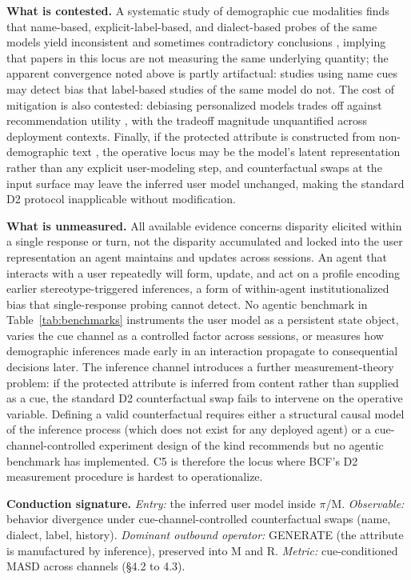 \documentclass[acmsmall,nonacm]{acmart}
\begin{document}
\textbf{What is contested.} A systematic study of demographic cue modalities finds that name-based, explicit-label-based, and dialect-based probes of the same models yield inconsistent and sometimes contradictory conclusions \cite{tonneau2026different}, implying that papers in this locus are not measuring the same underlying quantity; the apparent convergence noted above is partly artifactual: studies using name cues may detect bias that label-based studies of the same model do not. The cost of mitigation is also contested: debiasing personalized models trades off against recommendation utility \cite{vijjini2024exploring}, with the tradeoff magnitude unquantified across deployment contexts. Finally, if the protected attribute is constructed from non-demographic text \cite{staab2023memorization}, the operative locus may be the model's latent representation rather than any explicit user-modeling step, and counterfactual swaps at the input surface may leave the inferred user model unchanged, making the standard D2 protocol inapplicable without modification.

\textbf{What is unmeasured.} All available evidence concerns disparity elicited within a single response or turn, not the disparity accumulated and locked into the user representation an agent maintains and updates across sessions. An agent that interacts with a user repeatedly will form, update, and act on a profile encoding earlier stereotype-triggered inferences, a form of within-agent institutionalized bias that single-response probing cannot detect. No agentic benchmark in Table~\ref{tab:benchmarks} instruments the user model as a persistent state object, varies the cue channel as a controlled factor across sessions, or measures how demographic inferences made early in an interaction propagate to consequential decisions later. The inference channel \cite{staab2023memorization} introduces a further measurement-theory problem: if the protected attribute is inferred from content rather than supplied as a cue, the standard D2 counterfactual swap fails to intervene on the operative variable. Defining a valid counterfactual requires either a structural causal model of the inference process (which does not exist for any deployed agent) or a cue-channel-controlled experiment design of the kind \cite{tonneau2026different} recommends but no agentic benchmark has implemented. C5 is therefore the locus where BCF's D2 measurement procedure is hardest to operationalize.

\textbf{Conduction signature.} \emph{Entry:} the inferred user model inside $\pi$/M. \emph{Observable:} behavior divergence under cue-channel-controlled counterfactual swaps (name, dialect, label, history). \emph{Dominant outbound operator:} GENERATE (the attribute is manufactured by inference), preserved into M and R. \emph{Metric:} cue-conditioned MASD across channels (\S{}4.2 to 4.3).
\end{document}
